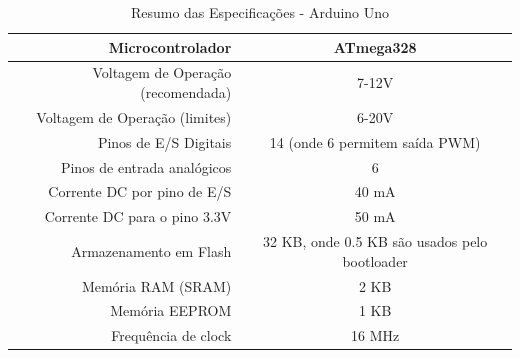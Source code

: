 \begin{table}[!h]
	\begin{tabular}{|r|c|}
		\hline
			Microcontrolador & ATmega328
		\\
		\hline
			Voltagem de Operação (recomendada) & 7-12V
		\\
		\hline
			Voltagem de Operação (limites) & 6-20V
		\\
		\hline
			Pinos de E/S Digitais & 14 (onde 6 permitem saída PWM)
		\\
		\hline
			Pinos de entrada analógicos & 6
		\\
		\hline
			Corrente DC por pino de E/S & 40 mA
		\\
		\hline
			Corrente DC para o pino 3.3V & 50 mA
		\\
		\hline
			Armazenamento em Flash & 32 KB, onde 0.5 KB são usados pelo bootloader
		\\
		\hline
			Memória RAM (SRAM) & 2 KB
		\\
		\hline
			Memória EEPROM & 1 KB
		\\
		\hline
			Frequência de clock & 16 MHz
		\\
\hline
\end{tabular}
\caption{Resumo das Especificações - Arduino Uno}
\end{table}


